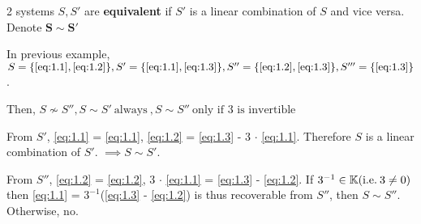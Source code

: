 \begin{definition} [Equivalance]
    2 systems \(S, S'\) are \textbf{equivalent} if \(S'\) is a linear combination of \(S\) and vice versa. Denote \(\mathbf{S \sim S'}\)
\end{definition}
\begin{example}
    In previous example, \(S = \{\eqref{eq:1.1}, \eqref{eq:1.2}\}, S' = \{\eqref{eq:1.1}, \eqref{eq:1.3}\}, S'' = \{\eqref{eq:1.2}, \eqref{eq:1.3}\}, S''' = \{\eqref{eq:1.3}\}\).

    Then, \(S \not\sim S'', S \sim S' \:\text{always}\:, S \sim S'' \:\text{only if 3 is invertible}\: \)
\end{example}
\begin{explanation}
    \hfill

    From \(S'\), \eqref{eq:1.1} = \eqref{eq:1.1}, \eqref{eq:1.2} = \eqref{eq:1.3} - 3 \(\cdot\) \eqref{eq:1.1}. Therefore \(S\) is a linear combination of \(S'\). \(\implies S \sim S'\).

    From \(S''\), \eqref{eq:1.2} = \eqref{eq:1.2}, 3 \(\cdot\) \eqref{eq:1.1} = \eqref{eq:1.3} - \eqref{eq:1.2}. If \(3^{-1} \in \mathbb{K} (\text{i.e.}\: 3 \neq 0)\) then \eqref{eq:1.1} = \(3^{-1}\)(\eqref{eq:1.3} - \eqref{eq:1.2}) is thus recoverable from \(S''\), then \(S \sim S''\). Otherwise, no.
\end{explanation}



